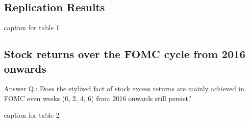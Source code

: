 \subsection{Replication Results}

\begin{table}[h]
\begin{center}
\begin{adjustbox}{width=1\textwidth}


\end{tabular}
}

\end{adjustbox}
\caption{\label{table_1} caption for table 1}
\end{center}
\end{table}


\subsection{Stock returns over the FOMC cycle from 2016 onwards}

Answer Q.: Does the stylized fact of stock excess returns are mainly achieved in FOMC even weeks (0,  2,  4,  6) from 2016 onwards still persist?

\begin{table}[h]
\begin{center}
\begin{adjustbox}{width=1\textwidth}

\end{tabular}
}
\end{adjustbox}
\caption{\label{table_2} caption for table 2}
\end{center}
\end{table}

\pagebreak



